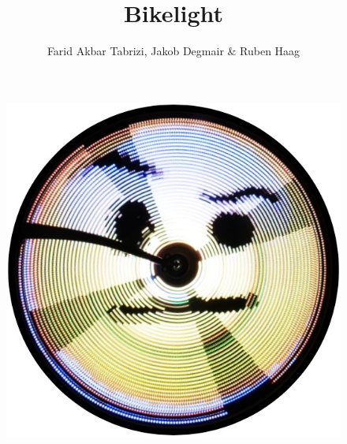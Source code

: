 \documentclass [a4paper, 11pt] {article}
\title{\textbf{Bikelight}}
\author{Farid Akbar Tabrizi, Jakob Degmair \& Ruben Haag}
\date{}
\begin{document}
\maketitle
\begin{figure}[H]
\centering
\includegraphics[width=16.0cm]{Smily3.png}
\end{figure}
\newpage
\tableofcontents
\newpage
\setlength{\parindent}{0pt}
\end{document}
